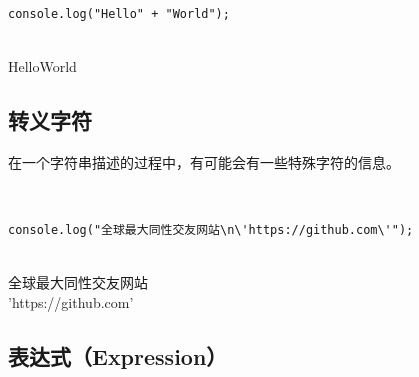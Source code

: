  \\

\begin{lstlisting}[style=htmlcssjs]
console.log("Hello" + "World");
\end{lstlisting}

\begin{tcolorbox}
	 \\
	HelloWorld
\end{tcolorbox}

\subsection{转义字符}

在一个字符串描述的过程中，有可能会有一些特殊字符的信息。

\begin{table}[H]
	\centering
	\caption{转义字符}
\end{table}

 \\

\begin{lstlisting}[style=htmlcssjs]
console.log("全球最大同性交友网站\n\'https://github.com\'");
\end{lstlisting}

\begin{tcolorbox}
	 \\
	全球最大同性交友网站 \\
	'https://github.com'
\end{tcolorbox}

\subsection{表达式（Expression）}

